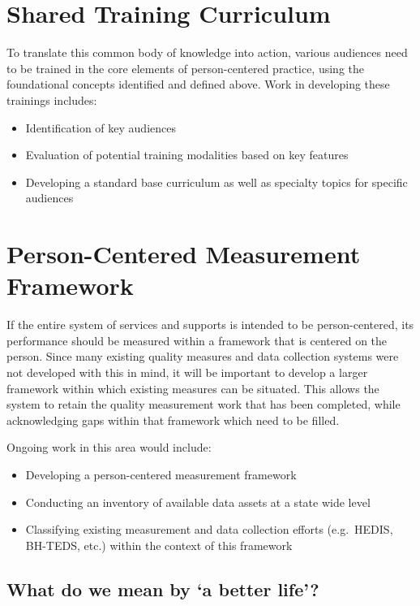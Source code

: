 \documentclass[
]{book}
\providecommand{\tightlist}{%
  \setlength{\itemsep}{0pt}\setlength{\parskip}{0pt}}
\begin{document}
\hypertarget{curriculum}{%
\chapter{Shared Training Curriculum}\label{curriculum}}

To translate this common body of knowledge into action, various audiences need to be trained in the core elements of person-centered practice, using the foundational concepts identified and defined above. Work in developing these trainings includes:

\begin{itemize}
\tightlist
\item
  Identification of key audiences
\item
  Evaluation of potential training modalities based on key features
\item
  Developing a standard base curriculum as well as specialty topics for specific audiences
\end{itemize}

\hypertarget{measure}{%
\chapter{Person-Centered Measurement Framework}\label{measure}}

If the entire system of services and supports is intended to be person-centered, its performance should be measured within a framework that is centered on the person. Since many existing quality measures and data collection systems were not developed with this in mind, it will be important to develop a larger framework within which existing measures can be situated. This allows the system to retain the quality measurement work that has been completed, while acknowledging gaps within that framework which need to be filled.

Ongoing work in this area would include:

\begin{itemize}
\tightlist
\item
  Developing a person-centered measurement framework
\item
  Conducting an inventory of available data assets at a state wide level
\item
  Classifying existing measurement and data collection efforts (e.g.~HEDIS, BH-TEDS, etc.) within the context of this framework
\end{itemize}

\hypertarget{what-do-we-mean-by-a-better-life}{%
\section{What do we mean by `a better life'?}\label{what-do-we-mean-by-a-better-life}}
\end{document}

